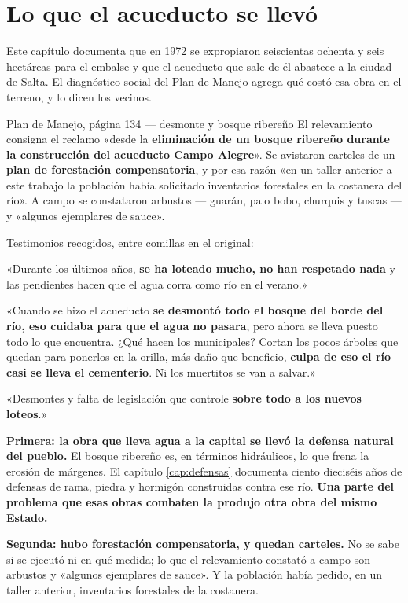 \section{Lo que el acueducto se llevó}

Este capítulo documenta que en 1972 se expropiaron seiscientas ochenta y seis hectáreas para
el embalse y que el acueducto que sale de él abastece a la ciudad de Salta. El diagnóstico
social del Plan de Manejo agrega qué costó esa obra en el terreno, y lo dicen los vecinos.

\begin{ficha}{Plan de Manejo, página 134 --- desmonte y bosque ribereño}
El relevamiento consigna el reclamo «desde la \textbf{eliminación de un bosque ribereño
durante la construcción del acueducto Campo Alegre}». Se avistaron carteles de un \textbf{plan
de forestación compensatoria}, y por esa razón «en un taller anterior a este trabajo la
población había solicitado inventarios forestales en la costanera del río». A campo se
constataron arbustos --- guarán, palo bobo, churquis y tuscas --- y «algunos ejemplares de
sauce».

Testimonios recogidos, entre comillas en el original:

«Durante los últimos años, \textbf{se ha loteado mucho, no han respetado nada} y las
pendientes hacen que el agua corra como río en el verano.»

«Cuando se hizo el acueducto \textbf{se desmontó todo el bosque del borde del río, eso cuidaba
para que el agua no pasara}, pero ahora se lleva puesto todo lo que encuentra. ¿Qué hacen los
municipales? Cortan los pocos árboles que quedan para ponerlos en la orilla, más daño que
beneficio, \textbf{culpa de eso el río casi se lleva el cementerio}. Ni los muertitos se van a
salvar.»

«Desmontes y falta de legislación que controle \textbf{sobre todo a los nuevos loteos}.»
\end{ficha}

\textbf{Primera: la obra que lleva agua a la capital se llevó la defensa natural del pueblo.}
El bosque ribereño es, en términos hidráulicos, lo que frena la erosión de márgenes. El capítulo \ref{cap:defensas} documenta ciento dieciséis años de defensas de rama, piedra y hormigón construidas
contra ese río. \textbf{Una parte del problema que esas obras combaten la produjo otra obra
del mismo Estado.}

\textbf{Segunda: hubo forestación compensatoria, y quedan carteles.} No se sabe si se
ejecutó ni en qué medida; lo que el relevamiento constató a campo son arbustos y «algunos
ejemplares de sauce». Y la población había pedido, en un taller anterior, inventarios
forestales de la costanera.

